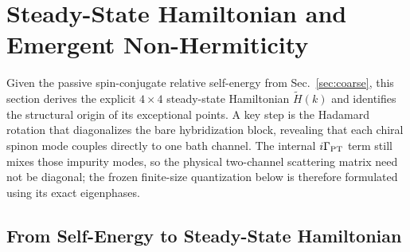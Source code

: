 \documentclass[%
  aps,prb,reprint,amsmath,amssymb,superscriptaddress,longbibliography,floatfix
]{revtex4-2}
\newcommand{\Htilde}{\tilde{H}}
\begin{document}
\section{Steady-State Hamiltonian and Emergent Non-Hermiticity}
\label{sec:Hss}

Given the passive spin-conjugate relative self-energy from Sec.~\ref{sec:coarse}, this section derives
the explicit $4\times4$ steady-state Hamiltonian $\Htilde(k)$
and identifies the structural origin of its exceptional points.
A key step is the Hadamard rotation that diagonalizes the bare
hybridization block, revealing that each chiral spinon mode
couples directly to one bath channel.  The internal
$i\Gamma_{\rm PT}$ term still mixes those impurity modes, so the physical
two-channel scattering matrix need not be diagonal; the frozen finite-size
quantization below is therefore formulated using its exact eigenphases.

\subsection{From Self-Energy to Steady-State Hamiltonian}
\label{sec:deriveHss}
\end{document}
